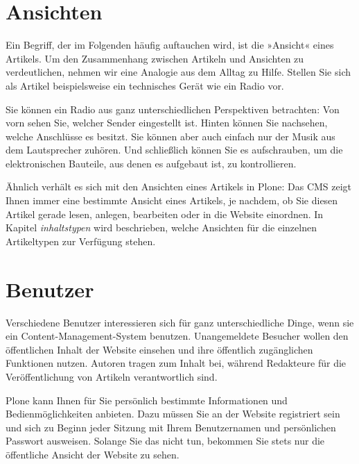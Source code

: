 \documentclass[a4paper,12pt,ngerman]{manual}
\begin{document}
\resetcurrentobjects
\hypertarget{--doc-grundlagen/ansichten}{}

\section{Ansichten}

Ein Begriff, der im Folgenden häufig auftauchen wird, ist die »Ansicht« eines
Artikels. Um den Zusammenhang zwischen Artikeln und Ansichten zu
verdeutlichen, nehmen wir eine Analogie aus dem Alltag zu Hilfe. Stellen Sie
sich als Artikel beispielsweise ein technisches Gerät wie ein Radio vor.

Sie können ein Radio aus ganz unterschiedlichen Perspektiven betrachten: Von
vorn sehen Sie, welcher Sender eingestellt ist. Hinten können Sie nachsehen,
welche Anschlüsse es besitzt. Sie können aber auch einfach nur der Musik aus
dem Lautsprecher zuhören. Und schließlich können Sie es aufschrauben, um die
elektronischen Bauteile, aus denen es aufgebaut ist, zu kontrollieren.

Ähnlich verhält es sich mit den Ansichten eines Artikels in Plone: Das CMS
zeigt Ihnen immer eine bestimmte Ansicht eines Artikels, je nachdem, ob Sie
diesen Artikel gerade lesen, anlegen, bearbeiten oder in die Website
einordnen. In Kapitel \emph{inhaltstypen} wird beschrieben, welche
Ansichten für die einzelnen Artikeltypen zur Verfügung stehen.

\resetcurrentobjects
\hypertarget{--doc-grundlagen/benutzer}{}

\hypertarget{index-1}{}\section{Benutzer}

Verschiedene Benutzer interessieren sich für ganz unterschiedliche Dinge, wenn
sie ein Content-Management-System benutzen.
Unangemeldete Besucher wollen den öffentlichen Inhalt der Website
einsehen und ihre öffentlich zugänglichen Funktionen nutzen. Autoren tragen
zum Inhalt bei, während Redakteure für die Veröffentlichung von Artikeln
verantwortlich sind.

Plone kann Ihnen für Sie persönlich bestimmte Informationen und
Bedienmöglichkeiten anbieten. Dazu müssen Sie an der Website registriert sein
und sich zu Beginn jeder Sitzung mit Ihrem Benutzernamen und persönlichen
Passwort ausweisen. Solange Sie das nicht tun, bekommen Sie stets nur die
öffentliche Ansicht der Website zu sehen.
\end{document}
